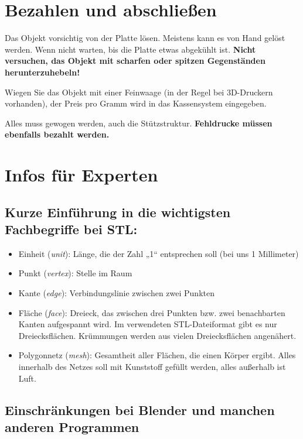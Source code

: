 \documentclass{\basedir/fablab-document}
\newcommand{\fachbegriff}[1]{(\textit{#1})}
\begin{document}
\section{Bezahlen und abschließen}

Das Objekt vorsichtig von der Platte lösen. Meistens kann es von Hand gelöst werden. Wenn nicht
warten, bis die Platte etwas abgekühlt ist. \textbf{Nicht versuchen, das Objekt mit scharfen oder spitzen Gegenständen herunterzuhebeln!}

Wiegen Sie das Objekt mit einer Feinwaage (in der Regel bei 3D-Druckern vorhanden), der Preis pro Gramm wird in das Kassensystem eingegeben.

Alles muss gewogen werden, auch die Stützstruktur. 
\textbf{Fehldrucke müssen ebenfalls bezahlt werden.}

\pagebreak


\section{Infos für Experten}

\subsection{Kurze Einführung in die wichtigsten Fachbegriffe bei STL:}

\begin{itemize}
\item Einheit \fachbegriff{unit}: Länge, die der Zahl „1“ entsprechen soll (bei uns
1 Millimeter)
\item Punkt \fachbegriff{vertex}: Stelle im Raum
\item Kante \fachbegriff{edge}: Verbindungslinie zwischen zwei Punkten
\item Fläche \fachbegriff{face}: Dreieck, das zwischen drei Punkten bzw. zwei
benachbarten Kanten aufgespannt wird. Im verwendeten STL-Dateiformat
gibt es nur Dreiecksflächen. Krümmungen werden aus vielen
Dreiecksflächen angenähert.
\item Polygonnetz \fachbegriff{mesh}: Gesamtheit aller Flächen, die einen Körper
ergibt. Alles innerhalb des Netzes soll mit Kunststoff gefüllt werden,
alles außerhalb ist Luft.
\end{itemize}

\subsection{Einschränkungen bei Blender und manchen anderen Programmen} \label{lowlevel-einschraenkungen}
\end{document}

